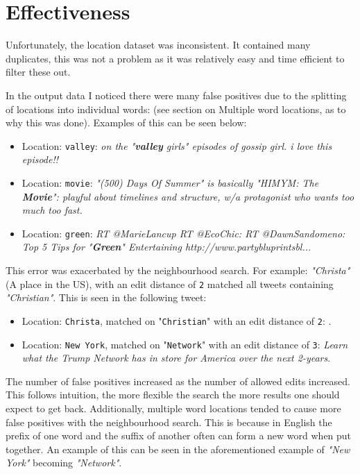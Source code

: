 \documentclass[a4paper]{article}
\begin{document}
\section{Effectiveness}
Unfortunately, the location dataset was inconsistent. It contained many duplicates, this was not a problem as it was relatively easy and time efficient to filter these out.

In the output data I noticed there were many false positives due to the splitting of locations into individual words: (see section on Multiple word locations, as to why this was done). Examples of this can be seen below:
\begin{itemize}
\item Location: \texttt{valley}:  \textit{on the "\textbf{valley} girls" episodes of gossip girl. i love this episode!!}
\item Location: \texttt{movie}:   \textit{"(500) Days Of Summer" is basically "HIMYM: The \textbf{Movie}": playful about timelines and structure, w/a protagonist who wants too much too fast.}
\item Location: \texttt{green}:   \textit{RT @MarieLancup RT @EcoChic: RT @DawnSandomeno: Top 5 Tips for "\textbf{Green}" Entertaining http://www.partybluprintsbl...}
\end{itemize}

This  error was exacerbated by the neighbourhood search. For example: \textit{"Christa"} (A place in the US), with an edit distance of \texttt{2} matched all tweets containing \textit{"Christian"}. This is seen in the following tweet:
\begin{itemize}
 \item Location: \texttt{Christa}, matched on "\texttt{Christian}" with an edit distance of \texttt{2}: \newline {}.
 \item Location: \texttt{New York}, matched on "\texttt{Network}" with an edit distance of \texttt{3}:  \newline \textit{Learn what the Trump Network has in store for America over the next 2-years}.
\end{itemize}
The number of false positives increased as the number of allowed edits increased. This follows intuition, the more flexible the search the more results one should expect to get back.
Additionally, multiple word locations tended to cause more false positives with the neighbourhood search. This is because in English the prefix of one word and the suffix of another often can form a new word when put together. An example of this can be seen in the aforementioned example of \textit{"New York"} becoming \textit{"Network"}.
\end{document}
